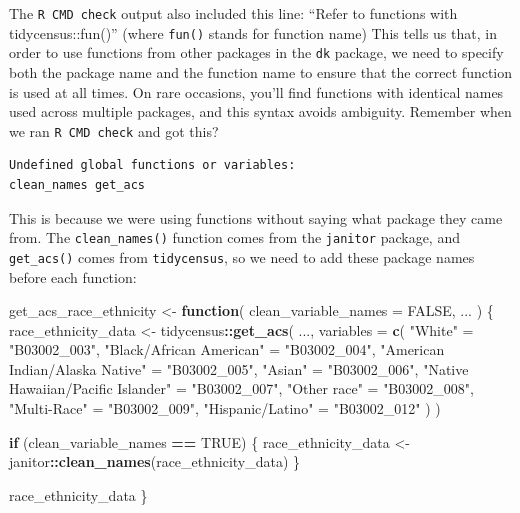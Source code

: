 \documentclass[
]{book}
\newenvironment{Shaded}{\begin{snugshade}}{\end{snugshade}}
\newcommand{\AttributeTok}[1]{\textcolor[rgb]{0.13,0.29,0.53}{#1}}
\newcommand{\ConstantTok}[1]{\textcolor[rgb]{0.56,0.35,0.01}{#1}}
\newcommand{\ControlFlowTok}[1]{\textcolor[rgb]{0.13,0.29,0.53}{\textbf{#1}}}
\newcommand{\FunctionTok}[1]{\textcolor[rgb]{0.13,0.29,0.53}{\textbf{#1}}}
\newcommand{\NormalTok}[1]{#1}
\newcommand{\OtherTok}[1]{\textcolor[rgb]{0.56,0.35,0.01}{#1}}
\newcommand{\SpecialCharTok}[1]{\textcolor[rgb]{0.81,0.36,0.00}{\textbf{#1}}}
\newcommand{\StringTok}[1]{\textcolor[rgb]{0.31,0.60,0.02}{#1}}
\begin{document}
The \texttt{R\ CMD\ check} output also included this line: ``Refer to functions with tidycensus::fun()'' (where \texttt{fun()} stands for function name) This tells us that, in order to use functions from other packages in the \texttt{dk} package, we need to specify both the package name and the function name to ensure that the correct function is used at all times. On rare occasions, you'll find functions with identical names used across multiple packages, and this syntax avoids ambiguity. Remember when we ran \texttt{R\ CMD\ check} and got this?

\begin{verbatim}
Undefined global functions or variables:
clean_names get_acs
\end{verbatim}

This is because we were using functions without saying what package they came from. The \texttt{clean\_names()} function comes from the \texttt{janitor} package, and \texttt{get\_acs()} comes from \texttt{tidycensus}, so we need to add these package names before each function:

\begin{Shaded}
\begin{Highlighting}[]
\NormalTok{get\_acs\_race\_ethnicity }\OtherTok{\textless{}{-}} \ControlFlowTok{function}\NormalTok{(}
  \AttributeTok{clean\_variable\_names =} \ConstantTok{FALSE}\NormalTok{,}
\NormalTok{  ...}
\NormalTok{) \{}
\NormalTok{  race\_ethnicity\_data }\OtherTok{\textless{}{-}}\NormalTok{ tidycensus}\SpecialCharTok{::}\FunctionTok{get\_acs}\NormalTok{(}
\NormalTok{    ...,}
    \AttributeTok{variables =} \FunctionTok{c}\NormalTok{(}
      \StringTok{"White"} \OtherTok{=} \StringTok{"B03002\_003"}\NormalTok{,}
      \StringTok{"Black/African American"} \OtherTok{=} \StringTok{"B03002\_004"}\NormalTok{,}
      \StringTok{"American Indian/Alaska Native"} \OtherTok{=} \StringTok{"B03002\_005"}\NormalTok{,}
      \StringTok{"Asian"} \OtherTok{=} \StringTok{"B03002\_006"}\NormalTok{,}
      \StringTok{"Native Hawaiian/Pacific Islander"} \OtherTok{=} \StringTok{"B03002\_007"}\NormalTok{,}
      \StringTok{"Other race"} \OtherTok{=} \StringTok{"B03002\_008"}\NormalTok{,}
      \StringTok{"Multi{-}Race"} \OtherTok{=} \StringTok{"B03002\_009"}\NormalTok{,}
      \StringTok{"Hispanic/Latino"} \OtherTok{=} \StringTok{"B03002\_012"}
\NormalTok{    )}
\NormalTok{  )}

  \ControlFlowTok{if}\NormalTok{ (clean\_variable\_names }\SpecialCharTok{==} \ConstantTok{TRUE}\NormalTok{) \{}
\NormalTok{    race\_ethnicity\_data }\OtherTok{\textless{}{-}}\NormalTok{ janitor}\SpecialCharTok{::}\FunctionTok{clean\_names}\NormalTok{(race\_ethnicity\_data)}
\NormalTok{  \}}

\NormalTok{  race\_ethnicity\_data}
\NormalTok{\}}
\end{Highlighting}
\end{Shaded}
\end{document}
